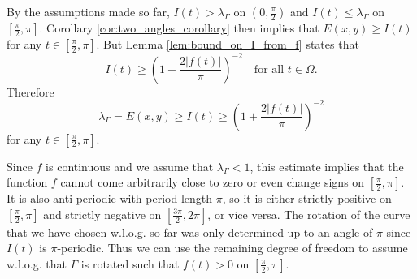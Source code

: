 \documentclass{article}
\begin{document}



By the assumptions made so far, $I(t) > \lambda_\Gamma$ on $(0,\frac\pi2)$ and $I(t) \le \lambda_\Gamma$ on $[\frac\pi2, \pi]$. 
Corollary \ref{cor:two_angles_corollary} then implies that $E(x,y) \ge I(t)$ for any $t\in[\frac\pi2,\pi]$. But Lemma \ref{lem:bound_on_I_from_f} states that
\begin{equation} \label{eq:bound_lambda_estimate_0}
    I(t) \ge \left(1 + \frac{2|f(t)|}{\pi}\right)^{-2}  \quad\text{for all } t\in\Omega.
\end{equation}
Therefore 
\begin{equation} \label{eq:bound_lambda_estimate_1}
    \lambda_\Gamma = E(x,y) \ge I(t) \ge \left(1 + \frac{2|f(t)|}{\pi}\right)^{-2}  
\end{equation}
for any $t\in[\frac\pi2,\pi]$.

Since $f$ is continuous and we assume that $\lambda_\Gamma < 1$, this estimate implies that the function $f$ cannot come arbitrarily close to zero or even change signs on $[\frac\pi2, \pi]$. It is also anti-periodic with period length $\pi$, so it is either strictly positive on $[\frac\pi2, \pi]$ and strictly negative on $[\frac{3\pi}2, 2\pi]$, or vice versa.
The rotation of the curve that we have chosen w.l.o.g. so far was only determined up to an angle of $\pi$ since $I(t)$ is $\pi$-periodic. Thus we can use the remaining degree of freedom to assume w.l.o.g. that $\Gamma$ is rotated such that $f(t)>0$ on $[\frac\pi2,\pi]$.
\end{document}
